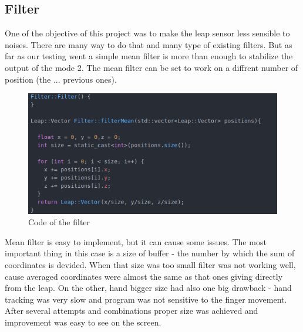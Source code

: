 \subsection{Filter}

One of the objective of this project was to make the leap sensor less sensible to noises. There are many way to do that and many type of existing filters. But as far as our testing went a simple mean filter is more than enough to stabilize the output of the mode 2. The mean filter can be set to work on a diffrent number of position (the ... previous ones).

\begin{figure}[H]
	\includegraphics[scale = 0.5]{codeFilter}
	\centering
	\caption{Code of the filter}
	\label{fig:filter}
\end{figure}

Mean filter is easy to implement, but it can cause some issues. The most important thing in this case is a size of buffer - the number by which the sum of coordinates is devided. When that size was too small filter was not working well, cause averaged coordinates were almost the same as that ones giving directly from the leap. On the other, hand bigger size had also one big drawback - hand tracking was very slow and program was not sensitive to the finger movement. After several attempts and combinations proper size was achieved and improvement was easy to see on the screen. 

